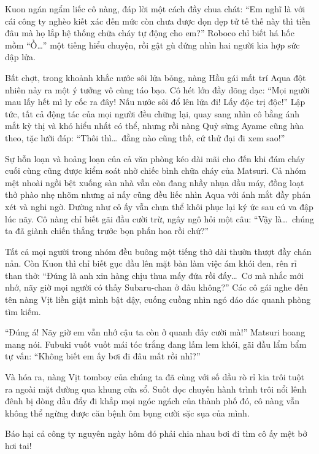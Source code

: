 \documentclass[../main.tex]{subfiles}
\begin{document}
Kuon ngán ngẩm liếc cô nàng, đáp lời một cách đầy chua chát: ``Em nghĩ là với cái công ty nghèo kiết xác đến mức còn chưa được dọn dẹp tử tế thế này thì tiền đâu mà họ lắp hệ thống chữa cháy tự động cho em?'' Roboco chỉ biết há hốc mồm ``Ồ\dots'' một tiếng hiểu chuyện, rồi gật gù đứng nhìn hai người kia hợp sức dập lửa.

Bất chợt, trong khoảnh khắc nước sôi lửa bỏng, nàng Hầu gái mất trí Aqua đột nhiên nảy ra một ý tưởng vô cùng táo bạo. Cô hét lớn đầy dõng dạc: ``Mọi người mau lấy hết mì ly cốc ra đây! Nấu nước sôi đổ lên lửa đi! Lấy độc trị độc!'' Lập tức, tất cả động tác của mọi người đều chững lại, quay sang nhìn cô bằng ánh mắt kỳ thị và khó hiểu nhất có thể, nhưng rồi nàng Quỷ sừng Ayame cũng hùa theo, tặc lưỡi đáp: ``Thôi thì\dots\ đằng nào cũng thế, cứ thử đại đi xem sao!''

\ct

Sự hỗn loạn và hoảng loạn của cả văn phòng kéo dài mãi cho đến khi đám cháy cuối cùng cũng được kiểm soát nhờ chiếc bình chữa cháy của Matsuri. Cả nhóm mệt nhoài ngồi bệt xuống sàn nhà vẫn còn đang nhầy nhụa dầu máy, đồng loạt thở phào nhẹ nhõm nhưng ai nấy cũng đều liếc nhìn Aqua với ánh mắt đầy phán xét và nghi ngờ. Dường như cô ấy vẫn chưa thể khôi phục lại ký ức sau cú va đập lúc nãy. Cô nàng chỉ biết gãi đầu cười trừ, ngây ngô hỏi một câu: ``Vậy là\dots\ chúng ta đã giành chiến thắng trước bọn phấn hoa rồi chứ?''

Tất cả mọi người trong nhóm đều buông một tiếng thở dài thườn thượt đầy chán nản. Còn Kuon thì chỉ biết gục đầu lên mặt bàn làm việc ám khói đen, rên rỉ than thở: ``Đúng là anh xin hàng chịu thua mấy đứa rồi đấy\dots\ Cơ mà nhắc mới nhớ, nãy giờ mọi người có thấy Subaru-chan ở đâu không?'' Các cô gái nghe đến tên nàng Vịt liền giật mình bật dậy, cuống cuồng nhìn ngó dáo dác quanh phòng tìm kiếm.

``Đúng á! Nãy giờ em vẫn nhớ cậu ta còn ở quanh đây cười mà!'' Matsuri hoang mang nói. Fubuki vuốt vuốt mái tóc trắng đang lấm lem khói, gãi đầu lẩm bẩm tự vấn: ``Không biết em ấy bơi đi đâu mất rồi nhỉ?''

Và hóa ra, nàng Vịt tomboy của chúng ta đã cùng với số dầu rò rỉ kia trôi tuột ra ngoài mặt đường qua khung cửa sổ. Suốt dọc chuyến hành trình trôi nổi lênh đênh bị dòng dầu đẩy đi khắp mọi ngóc ngách của thành phố đó, cô nàng vẫn không thể ngừng được căn bệnh ôm bụng cười sặc sụa của mình.

Báo hại cả công ty nguyên ngày hôm đó phải chia nhau bơi đi tìm cô ấy mệt bở hơi tai!
\end{document}
